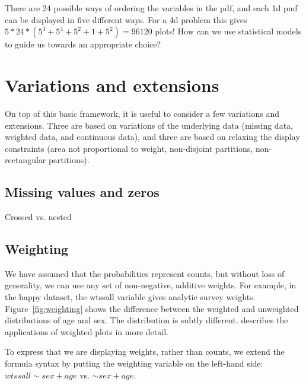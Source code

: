 \documentclass[letterpaper,oneside]{scrartcl}
\begin{document}
\noindent There are 24 possible ways of ordering the variables in the pdf, and each 1d pmf can be displayed in five different ways. For a 4d problem this gives $5 * 24 * (5^3 + 5^4 + 5^2 + 1 + 5^2) = 96120$ plots!  How can we use statistical models to guide us towards an appropriate choice?



\section{Variations and extensions}
\label{sec:variations}

On top of this basic framework, it is useful to consider a few variations and extensions.  Three are based on variations of the underlying data (missing data, weighted data, and continuous data), and three are based on relaxing the display constraints (area not proportional to weight, non-disjoint partitions, non-rectangular partitions).


\subsection{Missing values and zeros}
\label{sub:missing_values}

Crossed vs. nested

\subsection{Weighting}
\label{sub:weighting}

We have assumed that the probabilities represent counts, but without loss of generality, we can use any set of non-negative, additive weights. For example, in the happy dataset, the {\sf wtssall} variable gives analytic survey weights. Figure~\ref{fig:weighting} shows the difference between the weighted and unweighted distributions of age and sex. The distribution is subtly different. \citep{unwin:2007} describes the applications of weighted plots in more detail.

To express that we are displaying weights, rather than counts, we extend the formula syntax by putting the weighting variable on the left-hand side: $wtssall \sim sex + age$ vs. $ \sim sex + age$.
\end{document}
